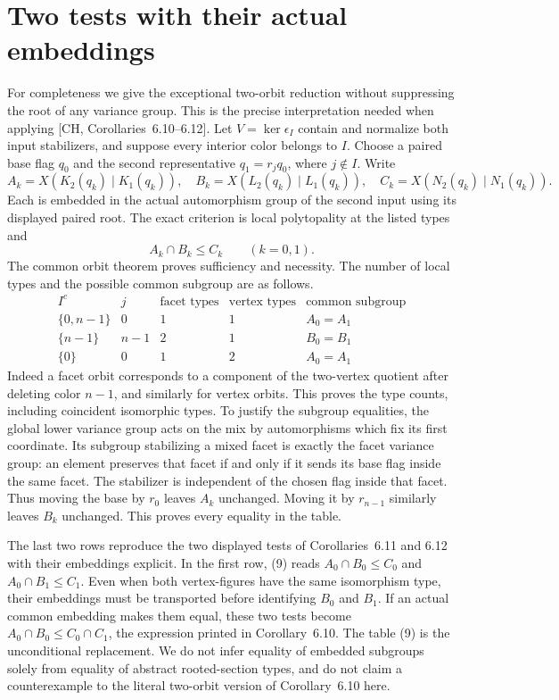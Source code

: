 \section{Two tests with their actual embeddings}
For completeness we give the exceptional two-orbit reduction without
suppressing the root of any variance group. This is the precise
interpretation needed when applying [CH, Corollaries~6.10--6.12].
Let $V=\ker\epsilon_I$ contain and normalize both input stabilizers,
and suppose every interior color belongs to $I$. Choose a paired base
flag $q_0$ and the second representative $q_1=r_jq_0$, where
$j\notin I$. Write
\[
 A_k=X(K_2(q_k)\mid K_1(q_k)),\quad
 B_k=X(L_2(q_k)\mid L_1(q_k)),\quad
 C_k=X(N_2(q_k)\mid N_1(q_k)).
\]
Each is embedded in the actual automorphism group of the second input
using its displayed paired root. The exact criterion is local
polytopality at the listed types and
\[
 A_k\cap B_k\leq C_k\qquad(k=0,1).                  \tag{9}
\]
The common orbit theorem proves sufficiency and necessity. The number
of local types and the possible common subgroup are as follows.
\[
\begin{array}{c|c|c|c|c}
 I^c&j&\text{facet types}&\text{vertex types}&\text{common subgroup}\\\hline
 \{0,n-1\}&0&1&1&A_0=A_1\\
 \{n-1\}&n-1&2&1&B_0=B_1\\
 \{0\}&0&1&2&A_0=A_1
\end{array}
\]
Indeed a facet orbit corresponds to a component of the two-vertex
quotient after deleting color $n-1$, and similarly for vertex orbits.
This proves the type counts, including coincident isomorphic types.
To justify the subgroup equalities, the global lower variance group
acts on the mix by automorphisms which fix its first coordinate. Its
subgroup stabilizing a mixed facet is exactly the facet variance group:
an element preserves that facet if and only if it sends its base flag
inside the same facet. The stabilizer is independent of the chosen
flag inside that facet. Thus moving the base by $r_0$ leaves $A_k$
unchanged. Moving it by $r_{n-1}$ similarly leaves $B_k$ unchanged.
This proves every equality in the table.

The last two rows reproduce the two displayed tests of Corollaries~6.11
and 6.12 with their embeddings explicit. In the first row, (9) reads
$A_0\cap B_0\leq C_0$ and $A_0\cap B_1\leq C_1$.
Even when both vertex-figures have the same isomorphism type, their
embeddings must be transported before identifying $B_0$ and $B_1$.
If an actual common embedding makes them equal, these two tests become
$A_0\cap B_0\leq C_0\cap C_1$, the expression printed in
Corollary~6.10. The table (9) is the unconditional replacement. We do
not infer equality of embedded subgroups solely from equality of
abstract rooted-section types, and do not claim a counterexample to
the literal two-orbit version of Corollary~6.10 here.
